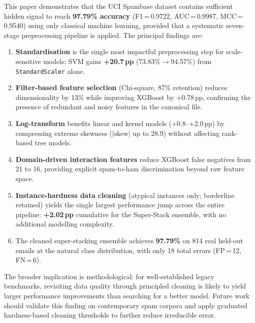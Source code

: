 \documentclass[conference]{IEEEtran}
\begin{document}
This paper demonstrates that the UCI Spambase dataset contains sufficient
hidden signal to reach \textbf{97.79\% accuracy}
(F1\,=\,0.9722, AUC\,=\,0.9987, MCC\,=\,0.9540) using
only classical machine learning, provided that a systematic
seven-stage preprocessing pipeline is applied. The principal
findings are:

\begin{enumerate}
  \item \textbf{Standardisation} is the single most impactful
        preprocessing step for scale-sensitive models: SVM gains
        \textbf{+20.7\,pp} (73.83\%$\to$94.57\%) from
        \texttt{StandardScaler} alone.
  \item \textbf{Filter-based feature selection} (Chi-square,
        87\% retention) reduces dimensionality by 13\% while
        improving XGBoost by +0.78\,pp, confirming the presence
        of redundant and noisy features in the canonical file.
  \item \textbf{Log-transform} benefits linear and kernel
        models (+0.8--+2.0\,pp) by compressing extreme skewness
        ($|\text{skew}|$ up to 28.9) without affecting
        rank-based tree models.
  \item \textbf{Domain-driven interaction features} reduce
        XGBoost false negatives from 21 to 16, providing
        explicit spam-to-ham discrimination beyond raw feature
        space.
  \item \textbf{Instance-hardness data cleaning} (atypical
        instances only; borderline retained) yields the
        single largest performance jump across the entire
        pipeline: \textbf{+2.02\,pp} cumulative for the
        Super-Stack ensemble, with no additional modelling
        complexity.
  \item The cleaned super-stacking ensemble achieves
        \textbf{97.79\%} on 814 real held-out emails at
        the natural class distribution, with only 18 total
        errors (FP\,=\,12, FN\,=\,6).
\end{enumerate}

The broader implication is methodological: for
well-established legacy benchmarks, revisiting data quality
through principled cleaning is likely to yield larger
performance improvements than searching for a better model.
Future work should validate this finding on contemporary
spam corpora and apply graduated hardness-based cleaning
thresholds to further reduce irreducible error.
\end{document}

